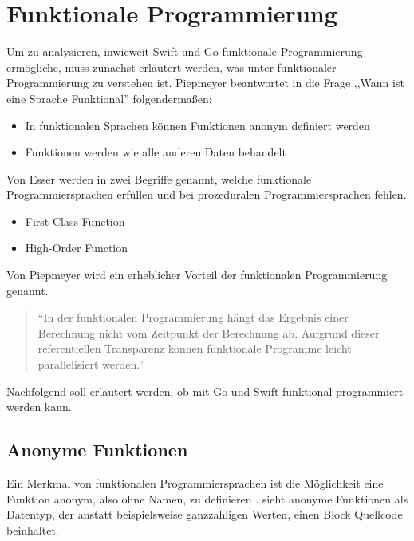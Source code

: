 \chapter{Funktionale Programmierung}
Um zu analysieren, inwieweit Swift und Go funktionale Programmierung ermögliche, muss zunächst erläutert werden, was unter funktionaler Programmierung zu verstehen ist.
Piepmeyer beantwortet in \cite[S.6]{Piepmeyer.2010} die Frage ,,Wann ist eine Sprache Funktional'' folgendermaßen:

\begin{itemize}
    \item In funktionalen Sprachen können Funktionen anonym definiert werden
    \item Funktionen werden wie alle anderen Daten behandelt
\end{itemize}

Von Esser werden in \cite[S.243]{Esser.2011} zwei Begriffe genannt, welche funktionale Programmiersprachen erfüllen und bei prozeduralen Programmiersprachen fehlen.

\begin{itemize}
    \item First-Class Function
    \item High-Order Function
\end{itemize}

Von Piepmeyer wird ein erheblicher Vorteil der funktionalen Programmierung genannt.

\begin{quote}
\enquote{In der funktionalen Programmierung hängt das Ergebnis einer Berechnung nicht vom Zeitpunkt der Berechnung ab. Aufgrund dieser referentiellen Transparenz können funktionale Programme leicht parallelisiert werden.} \cite[S.13]{Piepmeyer.2010}
\end{quote}

Nachfolgend soll erläutert werden, ob mit Go und Swift funktional programmiert werden kann.

\section{Anonyme Funktionen}
Ein Merkmal von funktionalen Programmiersprachen ist die Möglichkeit eine Funktion anonym, also ohne Namen, zu definieren \cite[S.28]{Piepmeyer.2010}.
\cite[S.219]{Hoffman.2017} sieht anonyme Funktionen als Datentyp, der anstatt beispielsweise ganzzahligen Werten, einen Block Quellcode beinhaltet.

